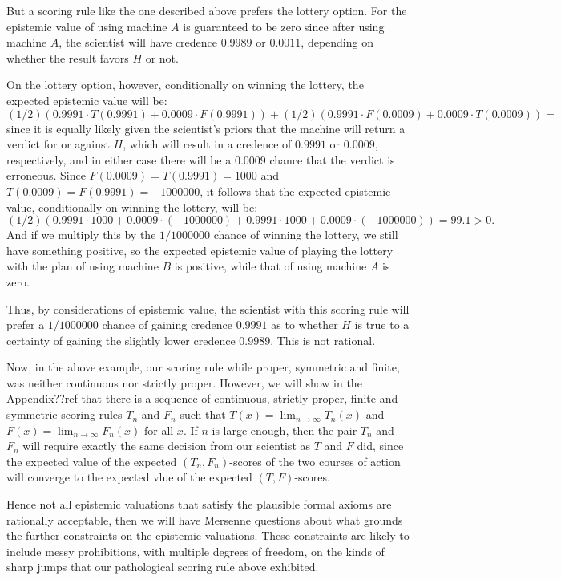 But a scoring rule like the one described above prefers the lottery option. For the epistemic value of using 
machine $A$ is guaranteed to be zero since after using machine $A$, the scientist will have credence $0.9989$ or $0.0011$, 
depending on whether the result favors $H$ or not.

On the lottery option, however, conditionally on winning the lottery, the expected epistemic value will be:
$$
    (1/2)(0.9991 \cdot T(0.9991)+0.0009\cdot F(0.9991))+(1/2)(0.9991 \cdot F(0.0009) + 0.0009\cdot T(0.0009))=
$$
since it is equally likely given the scientist's priors that the machine will return a verdict for or against $H$,
which will result in a credence of $0.9991$ or $0.0009$, respectively, and in either case there will be a $0.0009$
chance that the verdict is erroneous. Since $F(0.0009)=T(0.9991)=1000$ and $T(0.0009)=F(0.9991)=-1000000$, it follows 
that the expected epistemic value, conditionally on winning the lottery, will be:
$$
    (1/2)(0.9991 \cdot 1000+0.0009\cdot (-1000000)+0.9991 \cdot 1000+0.0009\cdot (-1000000)) = 99.1 > 0.
$$
And if we multiply this by the $1/1000000$ chance of winning the lottery, we still have something positive, so
the expected epistemic value of playing the lottery with the plan of using machine $B$ is positive, while that of
using machine $A$ is zero. 

Thus, by considerations of epistemic value, the scientist with this scoring rule will prefer a $1/1000000$ chance of 
gaining credence $0.9991$ as to whether $H$ is true to a certainty of gaining the slightly lower credence $0.9989$.
This is not rational. 

Now, in the above example, our scoring rule while proper, symmetric and finite, was neither continuous nor strictly proper. 
However, we will show in the Appendix??ref that there is a sequence of continuous, strictly proper, finite and symmetric
scoring rules $T_n$ and $F_n$ such that $T(x)=\lim_{n\to\infty} T_n(x)$ and $F(x)=\lim_{n\to\infty} F_n(x)$ for all $x$.
If $n$ is large enough, then the pair $T_n$ and $F_n$ will require exactly the same decision from our scientist as 
$T$ and $F$ did, since the expected value of the expected $(T_n,F_n)$-scores of the two courses of action will converge
to the expected vlue of the expected $(T,F)$-scores.

Hence not all epistemic valuations that satisfy the plausible formal axioms are rationally acceptable, then we 
will have Mersenne questions about what grounds the further constraints on the epistemic valuations. These constraints
are likely to include messy prohibitions, with multiple degrees of freedom, on the kinds of sharp jumps that our
pathological scoring rule above exhibited.

